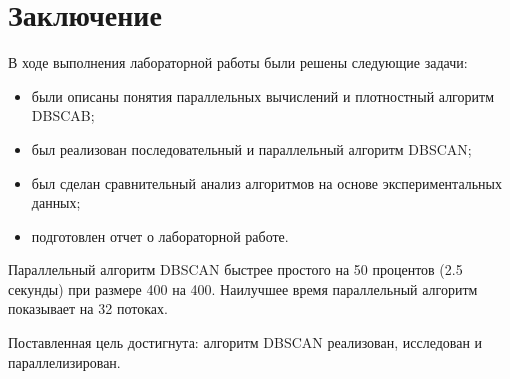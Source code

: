 \chapter*{Заключение}

В ходе выполнения лабораторной работы были решены следующие задачи:

\begin{itemize}
	\item были описаны понятия параллельных вычислений и плотностный алгоритм DBSCAB;
	
	\item был реализован последовательный и параллельный алгоритм DBSCAN;
	\item был сделан сравнительный анализ алгоритмов на основе экспериментальных данных;
	
	\item подготовлен отчет о лабораторной работе.
\end{itemize}

Параллельный алгоритм DBSCAN быстрее простого на 50 процентов (2.5 секунды) при размере 400 на 400.
Наилучшее время параллельный алгоритм показывает на 32 потоках.  

Поставленная цель достигнута: алгоритм DBSCAN реализован, исследован и параллелизирован.